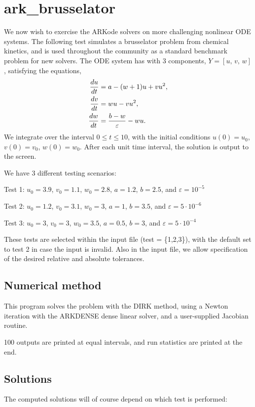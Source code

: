\documentclass[letterpaper,10pt,english]{sphinxmanual}
\begin{document}
\chapter{ark\_brusselator}
\label{ark_brusselator:ark-brusselator}\label{ark_brusselator::doc}\label{ark_brusselator:id1}
We now wish to exercise the ARKode solvers on more challenging
nonlinear ODE systems.  The following test simulates a brusselator
problem from chemical kinetics, and is used throughout the community
as a standard benchmark problem for new solvers.  The ODE system has
with 3 components, $Y = [u,\, v,\, w]$, satisfying the equations,
\begin{gather}
\begin{split}\frac{du}{dt} &= a - (w+1)u + v u^2, \\
\frac{dv}{dt} &= w u - v u^2, \\
\frac{dw}{dt} &= \frac{b-w}{\varepsilon} - w u.\end{split}\notag
\end{gather}
We integrate over the interval $0 \le t \le 10$, with the
initial conditions $u(0) = u_0$, $v(0) = v_0$, $w(0) = w_0$.
After each unit time interval, the solution is output to the screen.

We have 3 different testing scenarios:

Test 1:  $u_0=3.9$,  $v_0=1.1$,  $w_0=2.8$,
$a=1.2$, $b=2.5$, and $\varepsilon=10^{-5}$

Test 2:  $u_0=1.2$, $v_0=3.1$, $w_0=3$, $a=1$,
$b=3.5$, and $\varepsilon=5\cdot10^{-6}$

Test 3:  $u_0=3$, $v_0=3$, $w_0=3.5$, $a=0.5$,
$b=3$, and $\varepsilon=5\cdot10^{-4}$

These tests are selected within the input file (test = \{1,2,3\}),
with the default set to test 2 in case the input is invalid.
Also in the input file, we allow specification of the desired
relative and absolute tolerances.


\section{Numerical method}
\label{ark_brusselator:numerical-method}
This program solves the problem with the DIRK method, using a
Newton iteration with the ARKDENSE dense linear solver, and a
user-supplied Jacobian routine.

100 outputs are printed at equal intervals, and run statistics
are printed at the end.


\section{Solutions}
\label{ark_brusselator:solutions}
The computed solutions will of course depend on which test is
performed:
\end{document}
